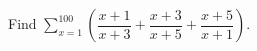 Find $\displaystyle\sum_{x=1}^{100}\left(\dfrac{x+1}{x+3}+\dfrac{x+3}{x+5}+\dfrac{x+5}{x+1}\right)$.
